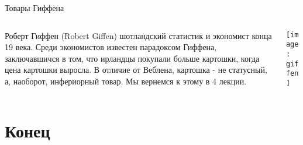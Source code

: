 \documentclass{beamer}
\begin{document}
\begin{frame}{Товары Гиффена}
\begin{columns}
\begin{column}{0.5\textwidth}
   \alert{Роберт Гиффен} (Robert Giffen) шотландский статистик и экономист конца 19 века. Среди экономистов известен \alert{парадоксом Гиффена}, заключавшичся в том, что ирландцы покупали больше картошки, когда цена картошки выросла. В отличие от Веблена, картошка - не статусный, а, наоборот, инфериорный товар. \alert{Мы вернемся к этому в 4 лекции}.

\end{column}
\begin{column}{0.5\textwidth}  %
    \begin{center}
     \texttt{[image: giffen]}
     \end{center}
\end{column}
\end{columns}
\end{frame}

\section{Конец}
\end{document}
